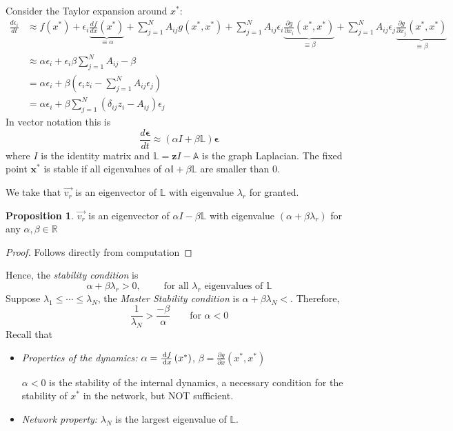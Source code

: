 \documentclass[12pt]{article}
\theoremstyle{definition}
\newtheorem{proposition}{Proposition}[section]
\newcommand{\diff}[1]{\hspace{1.5pt}\mathrm{d}{#1}}
\newcommand{\br}[1]{\left({#1}\right)}
\begin{document}
Consider the Taylor expansion around $x^*$:
\begin{align*}
\frac{d\epsilon_i}{dt}&\approx f(x^*)+\epsilon_i\underbrace{\frac{df}{dx}(x^*)}_{\equiv\alpha}+\sum_{j=1}^NA_{ij}g(x^*,x^*)+\sum_{j=1}^NA_{ij}\epsilon_i\underbrace{\frac{\partial g}{\partial x_i}(x^*,x^*)}_{\equiv\beta} + \sum_{j=1}^NA_{ij}\epsilon_j\underbrace{\frac{\partial g}{\partial x_j}(x^*,x^*)}_{\equiv\beta} \\
&\approx \alpha\epsilon_i+\epsilon_i\beta\sum_{j=1}^NA_{ij}-\beta \\
&= \alpha\epsilon_i+\beta(\epsilon_iz_i-\sum_{j=1}^NA_{ij}\epsilon_j)\\
&= \alpha\epsilon_i + \beta\sum_{j=1}^N(\delta_{ij}z_i-A_{ij})\epsilon_j
\end{align*}
In vector notation this is
\[ \frac{d\boldsymbol\epsilon}{dt} \approx (\alpha I + \beta \mathbb L)\boldsymbol{\epsilon}\]
where $I$ is the identity matrix and $\mathbb L = \boldsymbol{z} I - \mathbb A$ is the graph Laplacian.
The fixed point $\boldsymbol{x}^*$ is stable if all eigenvalues of $\alpha \mathbb I+ \beta \mathbb L$ are smaller than $0$.

We take that $\vec{v_r}$ is an eigenvector of $\mathbb{L}$ with eigenvalue $\lambda_r$ for granted. 
\begin{proposition}
    $\vec{v_r}$ is an eigenvector of $\alpha I-\beta\mathbb{L}$ with eigenvalue $(\alpha+\beta\lambda_r)$ for any $\alpha,\beta\in \mathbb{R}$
\end{proposition}
\begin{proof}
    Follows directly from computation
\end{proof}

Hence, the \textit{stability condition} is 
\[
\alpha+\beta\lambda_r>0, \qquad \text{ for all }\lambda_r \text{ eigenvalues of } \mathbb{L}
\]
Suppose $\lambda_1\leq\cdots\leq \lambda_N$, the \textit{Master Stability condition} is $\alpha+\beta\lambda_N<$. Therefore, 
\[
    \frac{1}{\lambda_N} >\frac{-\beta}\alpha \qquad \text{for }\alpha<0
\]
Recall that 
\begin{itemize}
    \item \textit{Properties of the dynamics:} $\alpha = \frac{\diff{f}}{\diff{x}}\br{x^*}$, $\beta = \frac{\partial g}{\partial x}\br{x^*,x^*}$

$\alpha<0$ is the stability of the internal dynamics, a necessary condition for the stability of $x^*$ in the network, but NOT sufficient. 
\item \textit{Network property:} $\lambda_N$ is the largest eigenvalue of $\mathbb{L}$.
\end{itemize}
\end{document}
